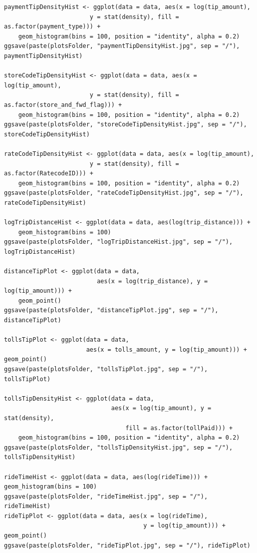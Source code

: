 \documentclass[11pt]{article}
\begin{document}
\begin{verbatim}
paymentTipDensityHist <- ggplot(data = data, aes(x = log(tip_amount),
                        y = stat(density), fill = as.factor(payment_type))) +
    geom_histogram(bins = 100, position = "identity", alpha = 0.2)
ggsave(paste(plotsFolder, "paymentTipDensityHist.jpg", sep = "/"),  paymentTipDensityHist)

storeCodeTipDensityHist <- ggplot(data = data, aes(x = log(tip_amount),
                        y = stat(density), fill = as.factor(store_and_fwd_flag))) +
    geom_histogram(bins = 100, position = "identity", alpha = 0.2)
ggsave(paste(plotsFolder, "storeCodeTipDensityHist.jpg", sep = "/"), storeCodeTipDensityHist)

rateCodeTipDensityHist <- ggplot(data = data, aes(x = log(tip_amount),
                        y = stat(density), fill = as.factor(RatecodeID))) +
    geom_histogram(bins = 100, position = "identity", alpha = 0.2)
ggsave(paste(plotsFolder, "rateCodeTipDensityHist.jpg", sep = "/"), rateCodeTipDensityHist)

logTripDistanceHist <- ggplot(data = data, aes(log(trip_distance))) +
    geom_histogram(bins = 100)
ggsave(paste(plotsFolder, "logTripDistanceHist.jpg", sep = "/"), logTripDistanceHist)

distanceTipPlot <- ggplot(data = data,
                          aes(x = log(trip_distance), y = log(tip_amount))) +
    geom_point()
ggsave(paste(plotsFolder, "distanceTipPlot.jpg", sep = "/"), distanceTipPlot)

tollsTipPlot <- ggplot(data = data,
                       aes(x = tolls_amount, y = log(tip_amount))) + geom_point()
ggsave(paste(plotsFolder, "tollsTipPlot.jpg", sep = "/"), tollsTipPlot)

tollsTipDensityHist <- ggplot(data = data,
                              aes(x = log(tip_amount), y = stat(density),
                                  fill = as.factor(tollPaid))) +
    geom_histogram(bins = 100, position = "identity", alpha = 0.2)
ggsave(paste(plotsFolder, "tollsTipDensityHist.jpg", sep = "/"), tollsTipDensityHist)

rideTimeHist <- ggplot(data = data, aes(log(rideTime))) + geom_histogram(bins = 100)
ggsave(paste(plotsFolder, "rideTimeHist.jpg", sep = "/"), rideTimeHist)
rideTipPlot <- ggplot(data = data, aes(x = log(rideTime),
                                       y = log(tip_amount))) + geom_point()
ggsave(paste(plotsFolder, "rideTipPlot.jpg", sep = "/"), rideTipPlot)

\end{verbatim}
\end{document}
